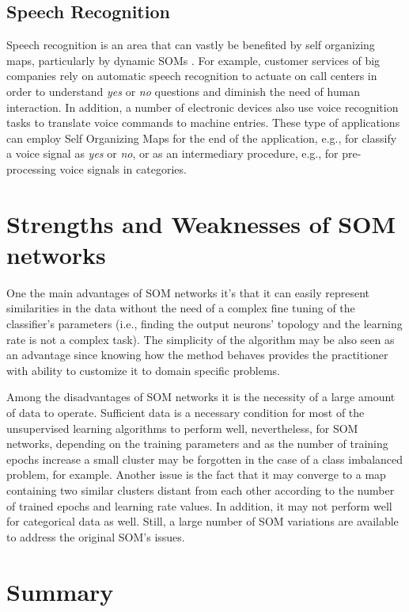 \subsection{Speech Recognition}

Speech recognition is an area that can vastly be benefited by self organizing maps, particularly by dynamic SOMs \cite{sp1}\cite{sp2}\cite{sp3}. For example, customer services of big companies rely on automatic speech recognition to actuate on call centers in order to understand \textit{yes} or \textit{no} questions and diminish the need of human interaction. In addition, a number of electronic devices also use voice recognition tasks to translate voice commands to machine entries. These type of applications can employ Self Organizing Maps for the end of the application, e.g., for classify a voice signal as \textit{yes} or \textit{no}, or as an intermediary procedure, e.g., for pre-processing voice signals in categories. 

\section{Strengths and Weaknesses of SOM networks}

One the main advantages of SOM networks it's that it can easily represent similarities in the data without the need of a complex fine tuning of the classifier's parameters (i.e., finding the output neurons' topology and the learning rate is not a complex task). The simplicity of the algorithm may be also seen as an advantage since knowing how the method behaves provides the practitioner with ability to customize it to domain specific problems. 

Among the disadvantages of SOM networks it is the necessity of a large amount of data to operate. Sufficient data is a necessary condition for most of the unsupervised learning algorithms to perform well, nevertheless, for SOM networks, depending on the training parameters and as the number of training epochs increase a small cluster may be forgotten in the case of a class imbalanced problem, for example. Another issue is the fact that it may converge to a map containing two similar clusters distant from each other according to the number of trained epochs and learning rate values. In addition, it may not perform well for categorical data as well. Still, a large number of SOM variations are available to address the original SOM's issues. 

\section{Summary}

